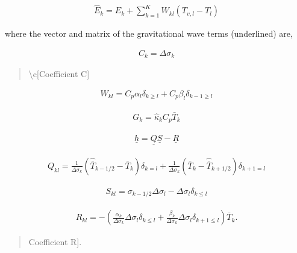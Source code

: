 \begin{eqnarray}
  \hat{E}_k = E_{k} 
            + \sum_{k=1}^{K} W_{kl} ( T_{v,l}-T_{l} )
\end{eqnarray}

where the vector and matrix of the gravitational wave terms (underlined)
are,

\begin{eqnarray}
  C_{k} = \Delta \sigma_{k}
\end{eqnarray}

\begin{quote}
\protect\hypertarget{Coefficientux20C}{}{\textbackslash c{[}Coefficient
C{]}}
\end{quote}

\begin{eqnarray}
  W_{kl} = C_{p} \alpha_{l} \delta_{k \geq l}
         + C_{p} \beta_{l} \delta_{k-1 \geq l}
\end{eqnarray}

\begin{eqnarray}
  G_{k} = \hat{\kappa}_{k} C_{p} \bar{T}_{k}
\end{eqnarray}

\begin{eqnarray}
\underline{h} = \underline{Q}\underline{S} - \underline{R}
\end{eqnarray}

\begin{eqnarray}
  Q_{kl} = \frac{1}{\Delta \sigma_{k}} 
             ( \hat{\bar{T}}_{k-1/2} - \bar{T}_{k} ) \delta_{k=l} 
         + \frac{1}{\Delta \sigma_{k}} 
             ( \bar{T}_{k} - \hat{\bar{T}}_{k+1/2}  ) \delta_{k+1=l} 
\end{eqnarray}

\begin{eqnarray}
  S_{kl} = \sigma_{k-1/2} \Delta \sigma_{l} 
           - \Delta \sigma_{l} \delta_{k \leq l } 
\end{eqnarray}

\begin{eqnarray}
  R_{kl} = - \left(  \frac{ \alpha_{k} }{ \Delta \sigma_{k} } 
                     \Delta \sigma_{l} \delta_{k \leq l} 
                   + \frac{ \beta_{k} }{ \Delta \sigma_{k} } 
                     \Delta \sigma_{l} \delta_{k+1 \leq l}  
             \right) \bar{T}_{k} .
\end{eqnarray}

\begin{quote}
\protect\hypertarget{Coefficientux20R}{}{\R{[}Coefficient R{]}}.
\end{quote}

